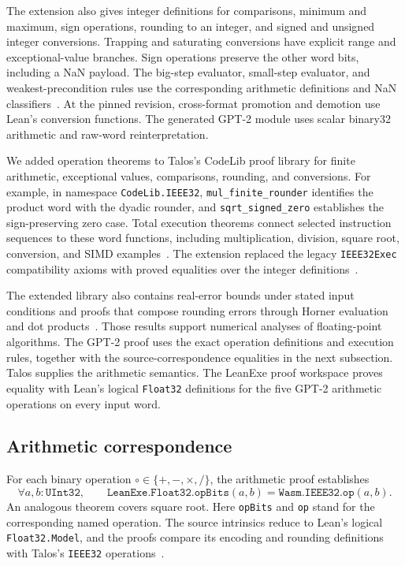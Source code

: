 \documentclass[11pt]{article}
\newcommand{\code}[1]{\texttt{#1}}
\begin{document}
The extension also gives integer definitions for comparisons, minimum and maximum, sign operations, rounding to an integer, and signed and unsigned integer conversions.  Trapping and saturating conversions have explicit range and exceptional-value branches.  Sign operations preserve the other word bits, including a NaN payload.  The big-step evaluator, small-step evaluator, and weakest-precondition rules use the corresponding arithmetic definitions and NaN classifiers~\cite{talosdispatch,talosfpproofs}.  At the pinned revision, cross-format promotion and demotion use Lean's conversion functions.  The generated GPT-2 module uses scalar binary32 arithmetic and raw-word reinterpretation.

We added operation theorems to Talos's CodeLib proof library for finite arithmetic, exceptional values, comparisons, rounding, and conversions.  For example, in namespace \code{CodeLib.IEEE32}, \code{mul\_finite\_rounder} identifies the product word with the dyadic rounder, and \code{sqrt\_signed\_zero} establishes the sign-preserving zero case.  Total execution theorems connect selected instruction sequences to these word functions, including multiplication, division, square root, conversion, and SIMD examples~\cite{talosfpproofs}.  The extension replaced the legacy \code{IEEE32Exec} compatibility axioms with proved equalities over the integer definitions~\cite{taloscompat}.

The extended library also contains real-error bounds under stated input conditions and proofs that compose rounding errors through Horner evaluation and dot products~\cite{talosnumeric}.  Those results support numerical analyses of floating-point algorithms.  The GPT-2 proof uses the exact operation definitions and execution rules, together with the source-correspondence equalities in the next subsection.  Talos supplies the arithmetic semantics.  The LeanExe proof workspace proves equality with Lean's logical \code{Float32} definitions for the five GPT-2 arithmetic operations on every input word.

\subsection{Arithmetic correspondence}

For each binary operation $\circ\in\{+,-,\times,/\}$, the arithmetic proof establishes
\[
\forall a,b:\code{UInt32},\qquad
\code{LeanExe.Float32.opBits}(a,b)
=\code{Wasm.IEEE32.op}(a,b).
\]
An analogous theorem covers square root.  Here \code{opBits} and \code{op} stand for the corresponding named operation.  The source intrinsics reduce to Lean's logical \code{Float32.Model}, and the proofs compare its encoding and rounding definitions with Talos's \code{IEEE32} operations~\cite{f32,leanfloat}.
\end{document}
